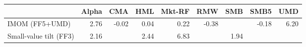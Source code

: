 \begin{tabular}{lrrrrrrrr}
\toprule
 & Alpha & CMA & HML & Mkt-RF & RMW & SMB & SMB5 & UMD \\
\midrule
IMOM (FF5+UMD) & 2.76 & -0.02 & 0.04 & 0.22 & -0.38 &  & -0.18 & 6.20 \\
Small-value tilt (FF3) & 2.16 &  & 2.44 & 6.83 &  & 1.94 &  &  \\
\bottomrule
\end{tabular}
